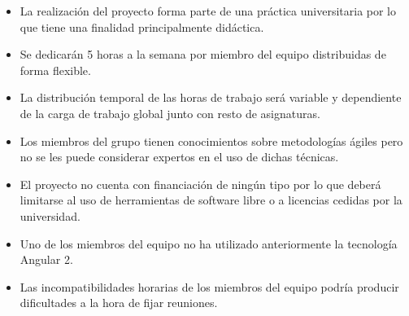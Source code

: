 \documentclass{article}
\begin{document}
            \begin{itemize}
            
            	\item La realización del proyecto forma parte de una práctica universitaria por lo que tiene una finalidad principalmente didáctica.
            	\item Se dedicarán 5 horas a la semana por miembro del equipo distribuidas de forma flexible.
				\item La distribución temporal de las horas de trabajo será variable y dependiente de la carga de trabajo global junto con resto de asignaturas.
                \item Los miembros del grupo tienen conocimientos sobre metodologías ágiles pero no se les puede considerar expertos en el uso de dichas técnicas.
                \item El proyecto no cuenta con financiación de ningún tipo por lo que deberá limitarse al uso de herramientas de software libre o a licencias cedidas por la universidad.
                \item Uno de los miembros del equipo no ha utilizado anteriormente la tecnología Angular 2.
                \item Las incompatibilidades horarias de los miembros del equipo podría producir dificultades a la hora de fijar reuniones.
                
             
            \end{itemize}
            
\end{document}
